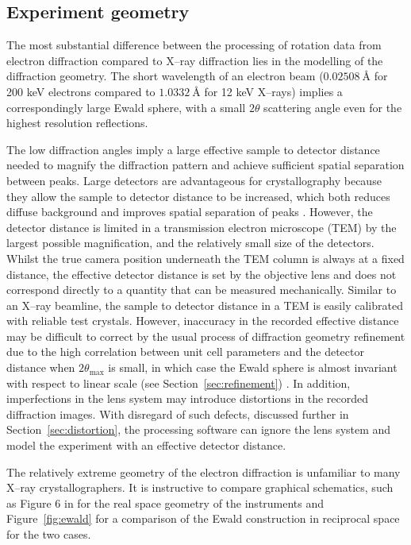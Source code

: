 \documentclass[preprint]{iucr}
\begin{document}
\subsection{Experiment geometry}

The most substantial difference between the processing of rotation data from
electron diffraction compared to X--ray diffraction lies in the modelling of the
diffraction geometry. The short wavelength of an electron beam
($\SI{0.02508}{\angstrom}$ for 200 keV electrons compared to
$\SI{1.0332}{\angstrom}$ for 12 keV X--rays) implies a correspondingly large
Ewald sphere, with a small
$2\theta$ scattering angle even for the highest resolution reflections.

The low
diffraction angles imply a large effective sample to detector distance needed to magnify
the diffraction pattern and achieve sufficient spatial
separation between peaks. Large detectors are advantageous
for crystallography because they allow the sample to detector distance to
be increased, which both reduces diffuse background and improves spatial
separation of peaks \cite{Stanton1993}. However,
the detector distance is limited in a transmission electron microscope (TEM)
by the largest possible magnification,
and the relatively small size of the detectors. Whilst the true camera position underneath the
TEM column is always at a fixed distance, the effective detector distance
is set by the objective lens and does not correspond directly to a quantity that
can be measured mechanically. Similar to an X--ray beamline, the sample to detector distance in
a TEM is easily calibrated with reliable test crystals. However,
inaccuracy in the recorded effective distance may be difficult to correct by the
usual process of diffraction geometry refinement due to the high correlation
between unit cell parameters and the detector distance when
$2\theta_{\text{max}}$ is small, in which case the Ewald sphere is almost
invariant with respect to linear scale (see Section~\ref{sec:refinement})
\cite{VanGenderen2016}.  In addition, imperfections in the lens system may
introduce distortions in the recorded diffraction images.  With disregard of
such defects, discussed further in Section~\ref{sec:distortion}, the processing
software can ignore the lens system and model the experiment with an effective
detector distance.

The relatively
extreme geometry of the electron diffraction is unfamiliar to many X--ray
crystallographers. It is instructive to compare graphical schematics, such as
Figure 6 in  for the real space geometry of the instruments
and Figure~\ref{fig:ewald} for a comparison of the Ewald construction in
reciprocal space for the two cases.
\end{document}

